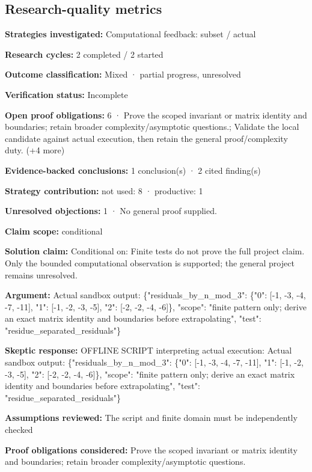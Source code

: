 \documentclass[11pt]{article}
\begin{document}
\subsection{Research-quality metrics}
\textbf{Strategies investigated:} Computational feedback: subset / actual\par
\textbf{Research cycles:} 2 completed / 2 started\par
\textbf{Outcome classification:} Mixed · partial progress, unresolved\par
\textbf{Verification status:} Incomplete\par
\textbf{Open proof obligations:} 6 · Prove the scoped invariant or matrix identity and boundaries; retain broader complexity/asymptotic questions.; Validate the local candidate against actual execution, then retain the general proof/complexity duty. (+4 more)\par
\textbf{Evidence-backed conclusions:} 1 conclusion(s) · 2 cited finding(s)\par
\textbf{Strategy contribution:} not used: 8 · productive: 1\par
\textbf{Unresolved objections:} 1 · No general proof supplied.\par
\textbf{Claim scope:} conditional\par
\textbf{Solution claim:} Conditional on: Finite tests do not prove the full project claim. Only the bounded computational observation is supported; the general project remains unresolved.\par
\textbf{Argument:} Actual sandbox output: \{"residuals\_by\_n\_mod\_3": \{"0": [-1, -3, -4, -7, -11], "1": [-1, -2, -3, -5], "2": [-2, -2, -4, -6]\}, "scope": "finite pattern only; derive an exact matrix identity and boundaries before extrapolating", "test": "residue\_separated\_residuals"\}\par
\textbf{Skeptic response:} OFFLINE SCRIPT interpreting actual execution: Actual sandbox output: \{"residuals\_by\_n\_mod\_3": \{"0": [-1, -3, -4, -7, -11], "1": [-1, -2, -3, -5], "2": [-2, -2, -4, -6]\}, "scope": "finite pattern only; derive an exact matrix identity and boundaries before extrapolating", "test": "residue\_separated\_residuals"\}\par
\textbf{Assumptions reviewed:} The script and finite domain must be independently checked\par
\textbf{Proof obligations considered:} Prove the scoped invariant or matrix identity and boundaries; retain broader complexity/asymptotic questions.\par
\end{document}
